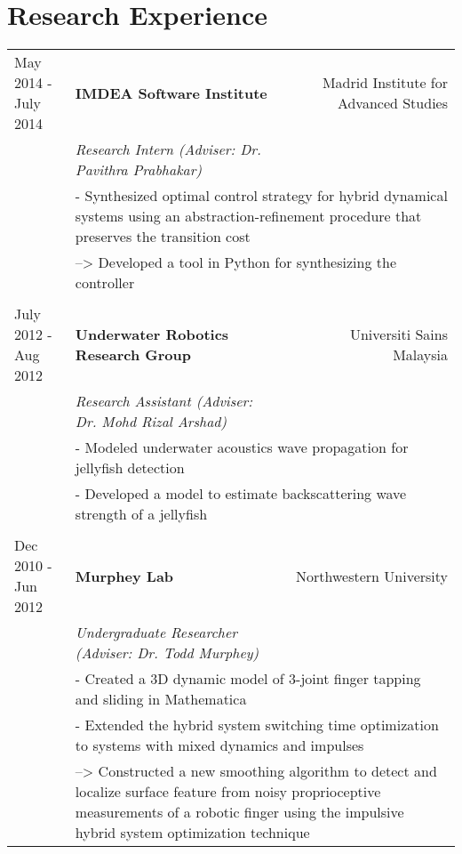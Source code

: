 \documentclass[letterpaper]{article}
\begin{document}
\newpage
\section*{Research Experience}

\begin{tabular*}{\textwidth}{@{\extracolsep{\fill}} l l r}
May 2014 - July 2014 &\textbf{IMDEA Software Institute} & Madrid Institute for Advanced Studies\\
 & \textit{Research Intern (Adviser: Dr. Pavithra Prabhakar)} & \\
 & \multicolumn{2}{p{0.8\textwidth}}{- Synthesized optimal control strategy for hybrid dynamical systems using an abstraction-refinement procedure that preserves the transition cost} \\ 
   & \multicolumn{2}{p{0.8\textwidth}}{--> Developed a tool in Python for synthesizing the controller} \\ \\
	
July 2012 - Aug 2012 &\textbf{Underwater Robotics Research Group} & Universiti Sains Malaysia\\
 & \textit{Research Assistant (Adviser: Dr. Mohd Rizal Arshad)} & \\
 & \multicolumn{2}{p{0.8\textwidth}}{- Modeled underwater acoustics wave propagation for jellyfish detection} \\ 
& \multicolumn{2}{p{0.8\textwidth}}{- Developed a model to estimate backscattering wave strength of a jellyfish  }  \\ \\

Dec 2010 - Jun 2012 &\textbf{Murphey Lab} & Northwestern University\\
 & \textit{Undergraduate Researcher (Adviser: Dr. Todd Murphey)} & \\
 & \multicolumn{2}{p{0.8\textwidth}}{- Created a 3D dynamic model of 3-joint finger tapping and sliding in Mathematica} \\ 
& \multicolumn{2}{p{0.8\textwidth}}{- Extended the hybrid system switching time optimization to systems with
mixed dynamics and impulses} \\
& \multicolumn{2}{p{0.8\textwidth}}{--> Constructed a new smoothing algorithm to detect and localize surface
feature from noisy proprioceptive measurements of a robotic finger
using the impulsive hybrid system optimization technique}
\end{tabular*}
\end{document}
